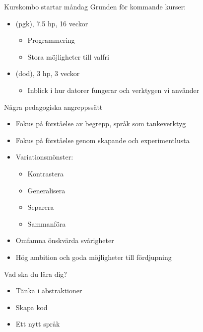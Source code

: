 \documentclass{lecturesimple}
\newcommand{\Startdag}{måndag}
\begin{document}
\begin{Slide}{Kurskombo startar \Startdag}
  Grunden för kommande kurser: \vspace{2em}
  \begin{itemize}
    \item {} (pgk), 7.5 hp, 16 veckor
    \begin{itemize}
      \item Programmering 
      \item Stora möjligheter till valfri 
    \end{itemize}
    \item {} (dod), 3 hp, 3 veckor
    \begin{itemize}
      \item Inblick i hur datorer fungerar och verktygen vi använder
    \end{itemize}
  \end{itemize}
\end{Slide}

\begin{Slide}{Några pedagogiska angreppssätt}
  \begin{itemize}
    \item Fokus på förståelse av begrepp, språk som tankeverktyg 
    \item Fokus på förståelse genom skapande och experimentlusta
    \item Variationsmönster: 
    \begin{itemize}
      \item Kontrastera
      \item Generalisera
      \item Separera
      \item Sammanföra
    \end{itemize} 
    \item Omfamna önskvärda svårigheter
    \item Hög ambition och goda möjligheter till fördjupning
  \end{itemize}
\end{Slide}

\begin{Slide}{Vad ska du lära dig?}
  \begin{itemize}
    \item Tänka i abstraktioner
    \item Skapa kod
    \item Ett nytt språk
  \end{itemize}
\end{Slide}
\end{document}
